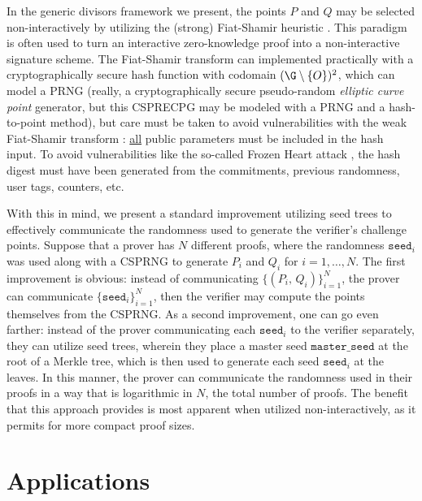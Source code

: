 \documentclass[11pt,letterpaper]{article}
\theoremstyle{definition}
\newcommand{\6}{\mathbf}
\newcommand{\7}{\mathcal}
\begin{document}
In the generic divisors framework we present, the points $P$ and $Q$ may be selected non-interactively by utilizing the (strong) Fiat-Shamir heuristic \cite{FiatShamir}.
This paradigm is often used to turn an interactive zero-knowledge proof into a non-interactive signature scheme.
The Fiat-Shamir transform can implemented practically with a cryptographically secure hash function with codomain $(\G\setminus\left\{O\right\})^2$, which can model a PRNG (really, a cryptographically secure pseudo-random \textit{elliptic curve point} generator, but this CSPRECPG may be modeled with a PRNG and a hash-to-point method), but care must be taken to avoid vulnerabilities with the weak Fiat-Shamir transform \cite{NHB,BPW,DMWG}: \underline{all} public parameters must be included in the hash input.
To avoid vulnerabilities like the so-called Frozen Heart attack \cite{Marvinblog, FH3}, the hash digest must have been generated from the commitments, previous randomness, user tags, counters, etc.





With this in mind, we present a standard improvement utilizing seed trees to effectively communicate the randomness used to generate the verifier's challenge points.
Suppose that a prover has $N$ different proofs, where the randomness $\texttt{seed}_i$ was used along with a CSPRNG to generate $P_i$ and $Q_i$ for $i=1, \dots, N$.
The first improvement is obvious: instead of communicating $\{(P_i, \, Q_i)\}_{i=1}^N$, the prover can communicate $\{\texttt{seed}_i\}_{i=1}^N$, then the verifier may compute the points themselves from the CSPRNG.
As a second improvement, one can go even farther: instead of the prover communicating each $\texttt{seed}_i$ to the verifier separately, they can utilize seed trees, wherein they place a master seed $\texttt{master\_seed}$ at the root of a Merkle tree, which is then used to generate each seed $\texttt{seed}_i$ at the leaves.
In this manner, the prover can communicate the randomness used in their proofs in a way that is logarithmic in $N$, the total number of proofs.
The benefit that this approach provides is most apparent when utilized non-interactively, as it permits for more compact proof sizes.











\section{Applications}
\end{document}
